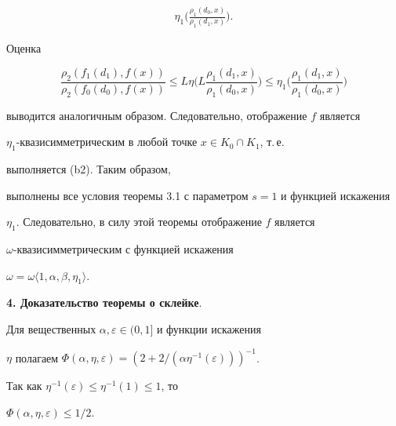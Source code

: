 \begin{pf}
\begin{multline*}
\eta_1\bigg( \frac{\rho_1(d_0, x)}{\rho_1(d_1, x)} \bigg). 


\end{multline*} 


Оценка 


$$


\frac{\rho_2(f_1(d_1), f(x))}{\rho_2(f_0(d_0), f(x))} \leq 


L\eta\bigg( L\frac{\rho_1(d_1, x)}{\rho_1(d_0,x)} \bigg) \leq 


\eta_1\bigg( \frac{\rho_1(d_1,x)}{\rho_1(d_0, x)}\bigg) 


$$


выводится аналогичным образом. Следовательно, отображение $f$ является 


$\eta_1$-{}квазисимметри\-чес\-ким в любой точке $x\in K_0\cap K_1$, т.\,е. 


выполняется (b2). Таким образом, 


выполнены все условия теоремы 3.1 с параметром $s=1$ и функцией искажения 


$\eta_1$. Следовательно, в силу этой теоремы отображение $f$ является 


$\omega$-{}квазисимметрическим с  функцией искажения 


$\omega=\omega \langle 1, \alpha, \beta, \eta_1 \rangle$. 


\end{pf}





\addtocounter{section}{1}


\setcounter{lems}{0}


\setcounter{equation}{0}


\setcounter{cors}{0}





{\bf 4. Доказательство теоремы о склейке}. 


Для вещественных $\alpha, \varepsilon \in (0,1]$ и функции искажения 


$\eta$ полагаем $ \Phi(\alpha, \eta, \varepsilon)=


(2+2/(\alpha \eta^{-1}(\varepsilon)))^{-1}$. 


Так как $\eta^{-1}(\varepsilon) \leq \eta^{-1}(1) \leq 1$, то 


$\Phi(\alpha, \eta, \varepsilon) \leq 1/2$.








